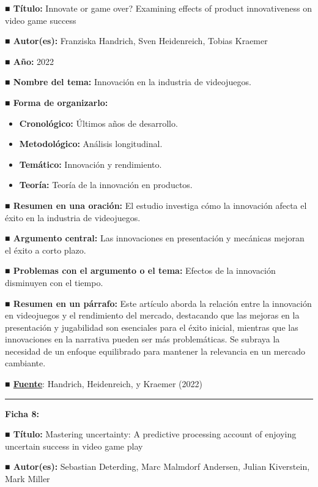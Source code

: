 \documentclass[
  letterpaper,
  DIV=11,
  numbers=noendperiod]{scrreprt}
\begin{document}
\textbf{■ Título:} Innovate or game over? Examining effects of product
innovativeness on video game success

\textbf{■ Autor(es):} Franziska Handrich, Sven Heidenreich, Tobias
Kraemer

\textbf{■ Año:} 2022

\textbf{■ Nombre del tema:} Innovación en la industria de videojuegos.

\textbf{■ Forma de organizarlo:}

\begin{itemize}
\item
  \textbf{Cronológico:} Últimos años de desarrollo.
\item
  \textbf{Metodológico:} Análisis longitudinal.
\item
  \textbf{Temático:} Innovación y rendimiento.
\item
  \textbf{Teoría:} Teoría de la innovación en productos.
\end{itemize}

\textbf{■ Resumen en una oración:} El estudio investiga cómo la
innovación afecta el éxito en la industria de videojuegos.

\textbf{■ Argumento central:} Las innovaciones en presentación y
mecánicas mejoran el éxito a corto plazo.

\textbf{■ Problemas con el argumento o el tema:} Efectos de la
innovación disminuyen con el tiempo.

\textbf{■ Resumen en un párrafo:} Este artículo aborda la relación entre
la innovación en videojuegos y el rendimiento del mercado, destacando
que las mejoras en la presentación y jugabilidad son esenciales para el
éxito inicial, mientras que las innovaciones en la narrativa pueden ser
más problemáticas. Se subraya la necesidad de un enfoque equilibrado
para mantener la relevancia en un mercado cambiante.

\textbf{■ \href{https://doi.org/10.1007/s12525-022-00521-7}{Fuente}}:
Handrich, Heidenreich, y Kraemer (2022)

\begin{center}\rule{0.5\linewidth}{0.5pt}\end{center}

\textbf{Ficha 8:}

\textbf{■ Título:} Mastering uncertainty: A predictive processing
account of enjoying uncertain success in video game play

\textbf{■ Autor(es):} Sebastian Deterding, Marc Malmdorf Andersen,
Julian Kiverstein, Mark Miller
\end{document}
